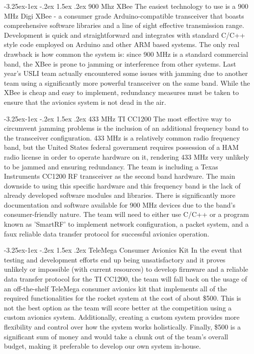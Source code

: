 \documentclass[onecolumn, draftclsnofoot, 10pt, compsoc]{IEEEtran}
\makeatletter
\renewcommand\paragraph{\@startsection{paragraph}{4}{\z@}%
                                     {-3.25ex\@plus -1ex \@minus -.2ex}%
                                     {1.5ex \@plus .2ex}%
                                     {\normalfont\normalsize\bfseries}}
\makeatother
\begin{document}
\paragraph{900 Mhz XBee}
The easiest technology to use is a 900 MHz Digi XBee - a consumer grade Arduino-compatible transceiver that boasts comprehensive software libraries and a line of sight effective transmission range. Development is quick and straightforward and integrates with standard C/C++ style code employed on Arduino and other ARM based systems. The only real drawback is how common the system is: since 900 MHz is a standard commercial band, the XBee is prone to jamming or interference from other systems. Last year's USLI team actually encountered some issues with jamming due to another team using a significantly more powerful transceiver on the same band. While the XBee is cheap and easy to implement, redundancy measures must be taken to ensure that the avionics system is not dead in the air.

\paragraph{433 MHz TI CC1200}
The most effective way to circumvent jamming problems is the inclusion of an additional frequency band to the transceiver configuration. 433 MHz is a relatively common radio frequency band, but the United States federal government requires possession of a HAM radio license in order to operate hardware on it, rendering 433 MHz very unlikely to be jammed and ensuring redundancy. The team is including a Texas Instruments CC1200 RF transceiver as the second band hardware. The main downside to using this specific hardware and this frequency band is the lack of already developed software modules and libraries. There is significantly more documentation and software available for 900 MHz devices due to the band's consumer-friendly nature. The team will need to either use C/C++ or a program known as 'SmartRF' to implement network configuration, a packet system, and a faux reliable data transfer protocol for successful avionics operation.

\paragraph{TeleMega Consumer Avionics Kit}
In the event that testing and development efforts end up being unsatisfactory and it proves unlikely or impossible (with current resources) to develop firmware and a reliable data transfer protocol for the TI CC1200, the team will fall back on the usage of an off-the-shelf TeleMega consumer avionics kit that implements all of the required functionalities for the rocket system at the cost of about \$500. This is not the best option as the team will score better at the competition using a custom avionics system. Additionally, creating a custom system provides more flexibility and control over how the system works holistically. Finally, \$500 is a significant sum of money and would take a chunk out of the team's overall budget, making it preferable to develop our own system in-house.
\end{document}
